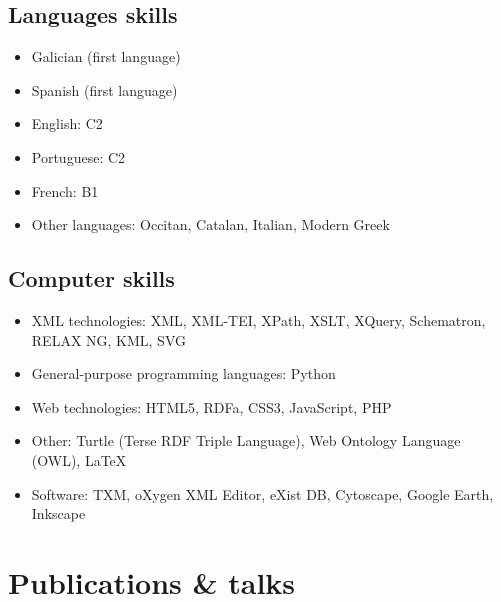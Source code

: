 \documentclass[11pt, a4paper]{article}
\begin{document}
\subsection{Languages skills}
\begin{itemize}[noitemsep]
 \item Galician (first language)
 \item Spanish (first language)
 \item English: C2
 \item Portuguese: C2
 \item French: B1
 \item Other languages: Occitan, Catalan, Italian, Modern Greek
\end{itemize}


\subsection{Computer skills}
\begin{itemize}[noitemsep]
 \item XML technologies: XML, XML-TEI, XPath, XSLT, XQuery, Schematron, RELAX NG, KML, SVG
 \item General-purpose programming languages: Python
 \item Web technologies: HTML5, RDFa, CSS3, JavaScript, PHP
 \item Other: Turtle (Terse RDF Triple Language), Web Ontology Language (OWL), LaTeX
 \item Software: TXM, oXygen XML Editor, eXist DB, Cytoscape, Google Earth, Inkscape 
\end{itemize}



\section{Publications \& talks}
\end{document}
